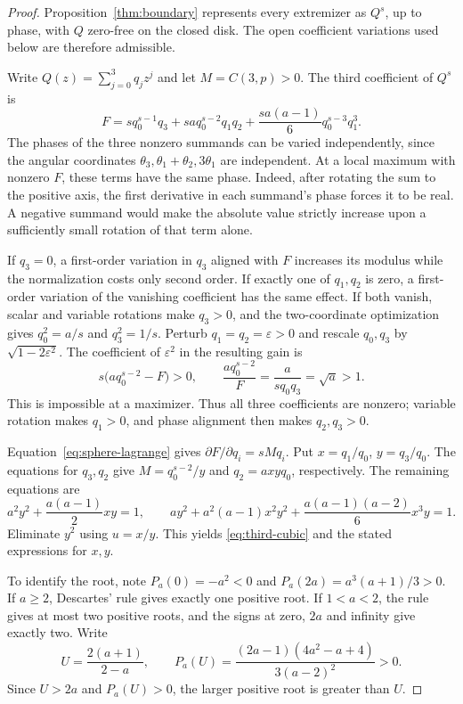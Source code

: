 \documentclass[11pt]{article}
\begin{document}
\begin{proof}
Proposition~\ref{thm:boundary} represents every extremizer as
\(Q^s\), up to phase, with \(Q\) zero-free on the closed disk.
The open coefficient variations used below are therefore admissible.

Write \(Q(z)=\sum_{j=0}^3 q_j z^j\) and let \(M=C(3,p)>0\). The third
coefficient of \(Q^s\) is
\begin{equation}\label{eq:third-coefficient}
 F=sq_0^{s-1}q_3
     +saq_0^{s-2}q_1q_2
     +\frac{sa(a-1)}6q_0^{s-3}q_1^3 .
\end{equation}
The phases of the three nonzero summands can be varied independently,
since the angular coordinates \(\theta_3,\theta_1+\theta_2,3\theta_1\)
are independent. At a local maximum with nonzero \(F\), these terms
have the same phase. Indeed, after rotating the sum to the positive
axis, the first derivative in each summand's phase forces it to be
real. A negative summand would make the absolute value strictly
increase upon a sufficiently small rotation of that term alone.

If \(q_3=0\), a first-order variation in \(q_3\) aligned with \(F\)
increases its modulus while the normalization costs only second order.
If exactly one of \(q_1,q_2\) is zero, a first-order variation of the
vanishing coefficient has the same effect. If both vanish, scalar
and variable rotations make \(q_3>0\), and the two-coordinate
optimization gives \(q_0^2=a/s\) and \(q_3^2=1/s\). Perturb
\(q_1=q_2=\varepsilon>0\) and rescale \(q_0,q_3\) by
\(\sqrt{1-2\varepsilon^2}\). The coefficient of \(\varepsilon^2\) in the resulting gain is
\[
 s\big(aq_0^{s-2}-F\big)>0,
 \qquad
 \frac{a q_0^{s-2}}{F}=\frac{a}{s q_0q_3}=\sqrt a>1.
\]
This is impossible at a maximizer. Thus all three coefficients are
nonzero; variable rotation makes \(q_1>0\), and phase alignment then
makes \(q_2,q_3>0\).

Equation~\eqref{eq:sphere-lagrange} gives \(\partial F/\partial q_i=sM q_i\).
Put \(x=q_1/q_0\), \(y=q_3/q_0\). The equations for \(q_3,q_2\)
give \(M=q_0^{s-2}/y\) and \(q_2=a x y q_0\), respectively.
The remaining equations are
\[
 a^2y^2+\frac{a(a-1)}2 x y=1,
 \qquad a y^2+a^2(a-1)x^2y^2
       +\frac{a(a-1)(a-2)}6x^3y=1.
\]
Eliminate \(y^2\) using \(u=x/y\). This yields
\eqref{eq:third-cubic} and the stated expressions for \(x,y\).

To identify the root, note \(P_a(0)=-a^2<0\) and
\(P_a(2a)=a^3(a+1)/3>0\). If \(a\geq2\),
Descartes' rule gives exactly one positive root.
If \(1<a<2\), the rule gives at most two positive roots, and
the signs at zero, \(2a\) and infinity give exactly two.
Write
\[
 U=\frac{2(a+1)}{2-a},\qquad
 P_a(U)=\frac{(2a-1)(4a^2-a+4)}{3(a-2)^2}>0 .
\]
Since \(U>2a\) and \(P_a(U)>0\), the larger positive root is greater than \(U\).


\end{proof}
\end{document}
